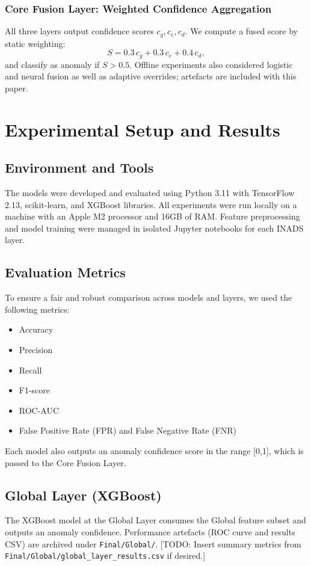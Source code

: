 \documentclass[conference]{IEEEtran}
\begin{document}
\subsubsection{Core Fusion Layer: Weighted Confidence Aggregation}
All three layers output confidence scores $c_g, c_e, c_d$. We compute a fused score by static weighting:
\[
S = 0.3\,c_g + 0.3\,c_e + 0.4\,c_d,
\]
and classify as anomaly if $S>0.5$. Offline experiments also considered logistic and neural fusion as well as adaptive overrides; artefacts are included with this paper.

\section{Experimental Setup and Results}

\subsection{Environment and Tools}
The models were developed and evaluated using Python 3.11 with TensorFlow 2.13, scikit-learn, and XGBoost libraries. All experiments were run locally on a machine with an Apple M2 processor and 16GB of RAM. Feature preprocessing and model training were managed in isolated Jupyter notebooks for each INADS layer.

\subsection{Evaluation Metrics}
To ensure a fair and robust comparison across models and layers, we used the following metrics:
\begin{itemize}
    \item Accuracy
    \item Precision
    \item Recall
    \item F1-score
    \item ROC-AUC
    \item False Positive Rate (FPR) and False Negative Rate (FNR)
\end{itemize}

Each model also outputs an anomaly confidence score in the range [0,1], which is passed to the Core Fusion Layer.

\subsection{Global Layer (XGBoost)}
The XGBoost model at the Global Layer consumes the Global feature subset and outputs an anomaly confidence. Performance artefacts (ROC curve and results CSV) are archived under \texttt{Final/Global/}. [TODO: Insert summary metrics from \texttt{Final/Global/global\_layer\_results.csv} if desired.]
\end{document}
